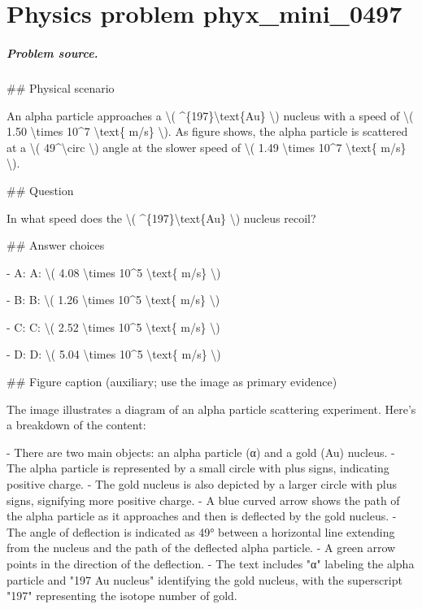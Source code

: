 
\chapter{Physics problem phyx\_mini\_0497}
\label{ch:PhyXMiniProblems_problem_phyx_mini_0497}

\paragraph{Problem source.}
\#\# Physical scenario

An alpha particle approaches a \textbackslash{}( \textasciicircum{}\{197\}\textbackslash{}text\{Au\} \textbackslash{}) nucleus with a speed of \textbackslash{}( 1.50 \textbackslash{}times 10\textasciicircum{}7 \textbackslash{}text\{ m/s\} \textbackslash{}). As figure shows, the alpha particle is scattered at a \textbackslash{}( 49\textasciicircum{}\textbackslash{}circ \textbackslash{}) angle at the slower speed of \textbackslash{}( 1.49 \textbackslash{}times 10\textasciicircum{}7 \textbackslash{}text\{ m/s\} \textbackslash{}).

\#\# Question

In what speed does the \textbackslash{}( \textasciicircum{}\{197\}\textbackslash{}text\{Au\} \textbackslash{}) nucleus recoil?

\#\# Answer choices

- A: A: \textbackslash{}( 4.08 \textbackslash{}times 10\textasciicircum{}5 \textbackslash{}text\{ m/s\} \textbackslash{})

- B: B: \textbackslash{}( 1.26 \textbackslash{}times 10\textasciicircum{}5 \textbackslash{}text\{ m/s\} \textbackslash{})

- C: C: \textbackslash{}( 2.52 \textbackslash{}times 10\textasciicircum{}5 \textbackslash{}text\{ m/s\} \textbackslash{})

- D: D: \textbackslash{}( 5.04 \textbackslash{}times 10\textasciicircum{}5 \textbackslash{}text\{ m/s\} \textbackslash{})

\#\# Figure caption (auxiliary; use the image as primary evidence)

The image illustrates a diagram of an alpha particle scattering experiment. Here's a breakdown of the content:

- There are two main objects: an alpha particle (α) and a gold (Au) nucleus.
- The alpha particle is represented by a small circle with plus signs, indicating positive charge.
- The gold nucleus is also depicted by a larger circle with plus signs, signifying more positive charge.
- A blue curved arrow shows the path of the alpha particle as it approaches and then is deflected by the gold nucleus.
- The angle of deflection is indicated as 49° between a horizontal line extending from the nucleus and the path of the deflected alpha particle.
- A green arrow points in the direction of the deflection.
- The text includes "α" labeling the alpha particle and "197 Au nucleus" identifying the gold nucleus, with the superscript "197" representing the isotope number of gold.

